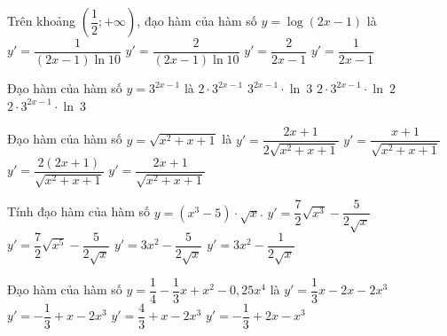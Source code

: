 \begin{ex}%
	Trên khoảng $\left(\dfrac{1}{2};+\infty \right)$, đạo hàm của hàm số  $y=\log (2x-1)$ là
	 \choice
		{$y'=\dfrac{1}{\left(2x-1\right)\ln 10}$} 
		{\True $y'=\dfrac{2}{\left(2x-1\right)\ln 10}$} 
		 {$y'=\dfrac{2}{2x-1}$}
		 {$y'=\dfrac{1}{2x-1}$}
\end{ex}

\begin{ex}%
	Đạo hàm của hàm số $y=3^{2x-1}$  là
	\choice 
		{$2  \cdot 3^{2x-1}$}
		{$3^{2x-1} \cdot  \ln~3$}
		{$2 \cdot 3^{2x-1} \cdot  \ln~2$}
		{\True $2  \cdot 3^{2x-1} \cdot \ln~3$}
\end{ex}

\begin{ex}%
	 Đạo hàm của hàm số $y=\sqrt{x^2+x+1}$ là
	\choice 
		 {\True $y'=\dfrac{2x+1}{2\sqrt{x^2+x+1}}$}
		{$y'=\dfrac{x+1}{\sqrt{x^2+x+1}}$} 
		 {$y'=\dfrac{2(2x+1)}{\sqrt{x^2+x+1}}$}
		{$y'=\dfrac{2x+1}{\sqrt{x^2+x+1}}$} 
\end{ex}

\begin{ex}%
	Tính đạo hàm của hàm số  $y=\left(x^3-5\right)\cdot\sqrt{x}$.
	 \choice
		 {$y'=\dfrac{7}{2}\sqrt{x^3}-\dfrac{5}{2\sqrt{x}}$}
		 {\True $y'=\dfrac{7}{2}\sqrt{x^5}-\dfrac{5}{2\sqrt{x}}$}
		 {$y'=3x^2-\dfrac{5}{2\sqrt{x}}$}
		 {$y'=3x^2-\dfrac{1}{2\sqrt{x}}$}
\end{ex}

\begin{ex}%
	Đạo  hàm của hàm số $y=\dfrac{1}{4}-\dfrac{1}{3}x+x^2-0{,}25x^4$ là
	\choice 
		 {$y'=\dfrac{1}{3}x-2x-2x^3$}
		{$y'=-\dfrac{1}{3}+x-2x^3$} 
		 {$y'=\dfrac{4}{3}+x-2x^3$}
		 {\True $y'=-\dfrac{1}{3}+2x-x^3$}
\end{ex}

